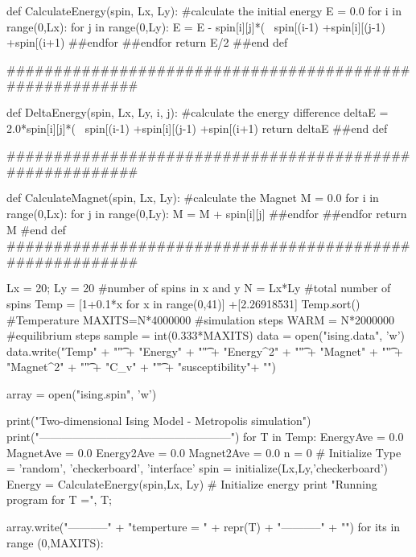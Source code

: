 \documentclass[11pt,a4paper,boxed]{caspset}
\begin{document}
\begin{subappendices}
\begin{python}
def CalculateEnergy(spin, Lx, Ly):
#calculate the initial energy
   E = 0.0
   for i in range(0,Lx):
       for j in range(0,Ly):
           E = E - spin[i][j]*(  \
                                 spin[(i-1)%
                +spin[i][(j-1)%
                                +spin[(i+1)%
       ##endfor
   ##endfor
   return E/2
##end def

#########################################################

def DeltaEnergy(spin, Lx, Ly, i, j):
#calculate the energy difference
    deltaE = 2.0*spin[i][j]*(  \
                               spin[(i-1)%
                +spin[i][(j-1)%
                              +spin[(i+1)%
    return deltaE
##end def

#########################################################

def CalculateMagnet(spin, Lx, Ly):
#calculate the Magnet
   M = 0.0
   for i in range(0,Lx):
       for j in range(0,Ly):
           M = M + spin[i][j]
       ##endfor
   ##endfor
   return M
#end def
#########################################################

Lx = 20; Ly = 20           #number of spins in x and y
N = Lx*Ly                  #total number of spins
Temp = [1+0.1*x for x in range(0,41)] +[2.26918531]
Temp.sort()                #Temperature
MAXITS=N*4000000           #simulation steps
WARM = N*2000000           #equilibrium steps
sample = int(0.333*MAXITS)
data = open("ising.data", 'w')
data.write("Temp"     + "\t" +
           "Energy"   + "\t" +
           "Energy^2" + "\t" +
           "Magnet"   + "\t" +
           "Magnet^2" + "\t" +
           "C_v"      + "\t" +
           "susceptibility"+ "\n")

array = open("ising.spin", 'w')

print("Two-dimensional Ising Model - Metropolis simulation")
print("---------------------------------------------------")
for T in Temp:
    EnergyAve = 0.0
    MagnetAve = 0.0
    Energy2Ave = 0.0
    Magnet2Ave = 0.0
    n = 0
    # Initialize Type = {'random', 'checkerboard', 'interface'}
    spin = initialize(Lx,Ly,'checkerboard')
    Energy = CalculateEnergy(spin,Lx, Ly) # Initialize energy
    print "Running program for T =", T;

    array.write("-----------" + "temperture = " + repr(T)
              + "-----------" + "\n")
    for its in range (0,MAXITS):


\end{python}
\end{subappendices}
\end{document}
